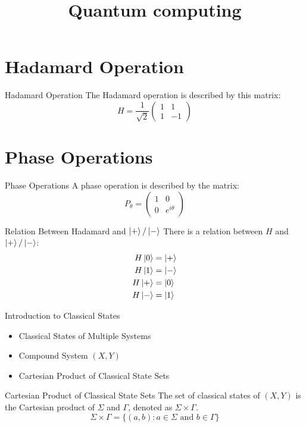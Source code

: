 \documentclass[12pt, aspectratio=169]{beamer}
\begin{document}
\section{Hadamard Operation}
\begin{frame}{Hadamard Operation}
    The Hadamard operation is described by this matrix:
    \[
    H = \frac{1}{\sqrt{2}} \begin{pmatrix} 1 & 1\\ 1 & -1 \end{pmatrix}
    \]
\end{frame}

\section{Phase Operations}
\begin{frame}{Phase Operations}
    A phase operation is described by the matrix:
    \[
    P_{\theta} = \begin{pmatrix} 1 & 0 \\ 0 & e^{i\theta} \end{pmatrix}
    \]
\end{frame}

\begin{frame}{Relation Between Hadamard and $\ket{+}/\ket{-}$}
    There is a relation between $H$ and $\ket{+}/\ket{-}$:
    \begin{align*}
        H\ket{0} &= \ket{+} \\
        H\ket{1} &= \ket{-} \\
        H\ket{+} &= \ket{0} \\
        H\ket{-} &= \ket{1}
    \end{align*}
\end{frame}

\newpage

\title{Quantum computing}

\begin{frame}{Introduction to Classical States}
    \begin{itemize}
        \item Classical States of Multiple Systems
        \item Compound System \((X, Y)\)
        \item Cartesian Product of Classical State Sets
    \end{itemize}
\end{frame}

\begin{frame}{Cartesian Product of Classical State Sets}
    The set of classical states of \((X, Y)\) is the Cartesian product of \(\Sigma\) and \(\Gamma\), denoted as \(\Sigma \times \Gamma\).
    \[
    \Sigma \times \Gamma = \{(a, b) : a \in \Sigma \text{ and } b \in \Gamma\}
    \]
\end{frame}
\end{document}
